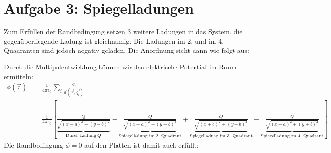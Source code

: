 \documentclass[11pt a4paper]{article}
\newcommand{\epsz}{\epsilon_0}
\newcommand{\kco}{\frac{1}{4\pi\epsilon_0}}
\begin{document}
\section*{Aufgabe 3: Spiegelladungen}
Zum Erfüllen der Randbedingung setzen 3 weitere Ladungen in das System,
die gegenüberliegende Ladung ist gleichnamig. Die Ladungen im 2. und im 4.
Quadranten sind jedoch negativ geladen. Die Anordnung sieht dann wie folgt
aus:
\newline
\begin{center}
\end{center}
Durch die Multipolentwicklung können wir das elektrische Potential im Raum ermitteln:
\begin{align*}
	\phi (\vec r)
	&= \frac1{4\pi\epsz} \sum_i \frac{q_i}{d(\vec r, \vec{q_i})} \\
	&= \kco \left[
		\underbrace{\frac{Q}{\sqrt{(x-a)^2 + (y-b)^2}}}_{
			\text{Durch Ladung } Q}
		- \underbrace{\frac{Q}{\sqrt{(x+a)^2 + (y-b)^2}} }_{
			\text{Spiegelladung im 2. Quadrant}}
		+ \underbrace{\frac{Q}{\sqrt{(x + a)^2 + (y+b)^2}} }_{
			\text{Spiegelladung im 3. Quadrant}}
		- \underbrace{\frac{Q}{\sqrt{(x-a)^2 + (y+b)^2}} }_{
			\text{Spiegelladung im 4. Quadrant}}
	\right]
\end{align*}
Die Randbedingung $\phi = 0$ auf den Platten ist damit auch erfüllt:
\end{document}
